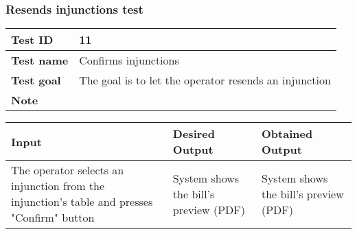 {{		\subsubsection{Resends injunctions test}{
			\begin{table}[h]
			\begin{tabular}{|p{4cm}|p{10cm}|}
			\hline
				\centering \vspace{1mm} \bfseries{Test ID} \vspace{1mm} & 
				\vspace{1mm} 11 \vspace{1mm}\\
			\hline
				\centering \vspace{1mm} \bfseries{Test name} \vspace{1mm} & 
				\vspace{1mm} Confirms injunctions \vspace{1mm}\\
			\hline
				\centering \vspace{1mm} \bfseries{Test goal} \vspace{1mm} & 
				\vspace{1mm} The goal is to let the operator resends an injunction\vspace{1mm}\\
			\hline
				\centering \vspace{1mm} \bfseries{Note} \vspace{1mm} & 
				\vspace{1mm}  \vspace{1mm}\\
			\hline
			\end{tabular}
			\end{table}

			\begin{table}[h]
			\begin{tabular}{|p{4cm}|p{5cm}|p{5cm}|}
			\hline
			\centering \vspace{1mm} \bfseries{Input} \vspace{1mm} & \vspace{1mm} \bfseries{Desired Output} \vspace{1mm} & \vspace{1mm} \bfseries{Obtained Output} \vspace{1mm}\\
			\hline
				\vspace{1mm} The operator selects an injunction from the injunction's table and presses "Confirm" button \vspace{1mm} &
				\vspace{1mm} System shows the bill's preview (PDF) \vspace{1mm} & 
				\vspace{1mm} System shows the bill's preview (PDF) \vspace{1mm} \\
			\hline
			\end{tabular}
			\end{table}
		}
		\clearpage
	}
}